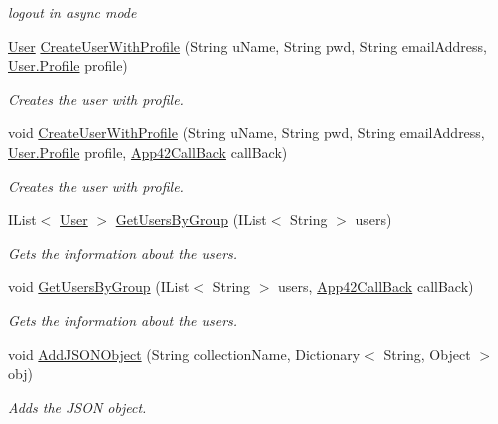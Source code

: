\begin{DoxyCompactItemize}
\begin{DoxyCompactList}\small\item\em logout in async mode \end{DoxyCompactList}\item 
\hyperlink{classcom_1_1shephertz_1_1app42_1_1paas_1_1sdk_1_1csharp_1_1user_1_1_user}{User} \hyperlink{classcom_1_1shephertz_1_1app42_1_1paas_1_1sdk_1_1csharp_1_1user_1_1_user_service_abe6b6e452a11ce653b3f40376e6c653b}{Create\+User\+With\+Profile} (String u\+Name, String pwd, String email\+Address, \hyperlink{classcom_1_1shephertz_1_1app42_1_1paas_1_1sdk_1_1csharp_1_1user_1_1_user_1_1_profile}{User.\+Profile} profile)
\begin{DoxyCompactList}\small\item\em Creates the user with profile. \end{DoxyCompactList}\item 
void \hyperlink{classcom_1_1shephertz_1_1app42_1_1paas_1_1sdk_1_1csharp_1_1user_1_1_user_service_ab708fbc53292bfa1f19469bb968ebc85}{Create\+User\+With\+Profile} (String u\+Name, String pwd, String email\+Address, \hyperlink{classcom_1_1shephertz_1_1app42_1_1paas_1_1sdk_1_1csharp_1_1user_1_1_user_1_1_profile}{User.\+Profile} profile, \hyperlink{interfacecom_1_1shephertz_1_1app42_1_1paas_1_1sdk_1_1csharp_1_1_app42_call_back}{App42\+Call\+Back} call\+Back)
\begin{DoxyCompactList}\small\item\em Creates the user with profile. \end{DoxyCompactList}\item 
I\+List$<$ \hyperlink{classcom_1_1shephertz_1_1app42_1_1paas_1_1sdk_1_1csharp_1_1user_1_1_user}{User} $>$ \hyperlink{classcom_1_1shephertz_1_1app42_1_1paas_1_1sdk_1_1csharp_1_1user_1_1_user_service_a857fa553dfaba2c05dc16730243fdb4b}{Get\+Users\+By\+Group} (I\+List$<$ String $>$ users)
\begin{DoxyCompactList}\small\item\em Gets the information about the users. \end{DoxyCompactList}\item 
void \hyperlink{classcom_1_1shephertz_1_1app42_1_1paas_1_1sdk_1_1csharp_1_1user_1_1_user_service_ab0ac51086e659b281634dc60fb0e9976}{Get\+Users\+By\+Group} (I\+List$<$ String $>$ users, \hyperlink{interfacecom_1_1shephertz_1_1app42_1_1paas_1_1sdk_1_1csharp_1_1_app42_call_back}{App42\+Call\+Back} call\+Back)
\begin{DoxyCompactList}\small\item\em Gets the information about the users. \end{DoxyCompactList}\item 
void \hyperlink{classcom_1_1shephertz_1_1app42_1_1paas_1_1sdk_1_1csharp_1_1user_1_1_user_service_a455dc3e3c0ea108eb33eeb90f72fa7d2}{Add\+J\+S\+O\+N\+Object} (String collection\+Name, Dictionary$<$ String, Object $>$ obj)
\begin{DoxyCompactList}\small\item\em Adds the J\+S\+O\+N object. \end{DoxyCompactList}\end{DoxyCompactItemize}

